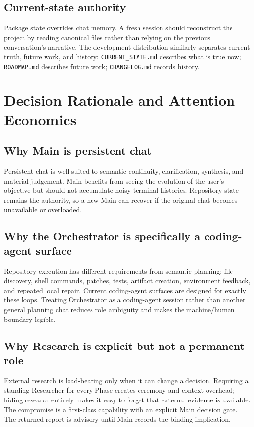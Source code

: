 \documentclass[11pt,a4paper]{article}
\begin{document}
\subsection{Current-state authority}
Package state overrides chat memory. A fresh session should reconstruct the project by reading canonical files rather than relying on the previous conversation's narrative. The development distribution similarly separates current truth, future work, and history: \texttt{CURRENT\_STATE.md} describes what is true now; \texttt{ROADMAP.md} describes future work; \texttt{CHANGELOG.md} records history.


\section{Decision Rationale and Attention Economics}\label{sec:decision-rationale}

\subsection{Why Main is persistent chat}
Persistent chat is well suited to semantic continuity, clarification, synthesis, and material judgement. Main benefits from seeing the evolution of the user's objective but should not accumulate noisy terminal histories. Repository state remains the authority, so a new Main can recover if the original chat becomes unavailable or overloaded.

\subsection{Why the Orchestrator is specifically a coding-agent surface}
Repository execution has different requirements from semantic planning: file discovery, shell commands, patches, tests, artifact creation, environment feedback, and repeated local repair. Current coding-agent surfaces are designed for exactly these loops. Treating Orchestrator as a coding-agent session rather than another general planning chat reduces role ambiguity and makes the machine/human boundary legible.

\subsection{Why Research is explicit but not a permanent role}
External research is load-bearing only when it can change a decision. Requiring a standing Researcher for every Phase creates ceremony and context overhead; hiding research entirely makes it easy to forget that external evidence is available. The compromise is a first-class capability with an explicit Main decision gate. The returned report is advisory until Main records the binding implication.
\end{document}
